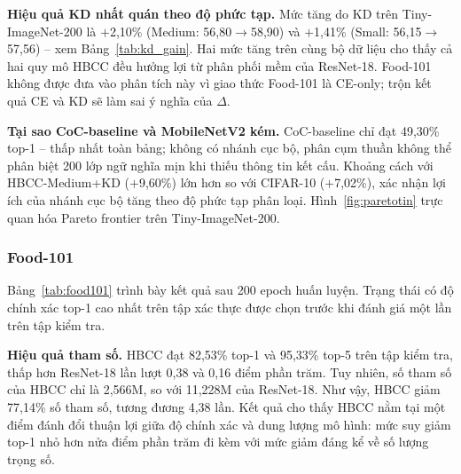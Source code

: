 \documentclass[conference]{IEEEtran}
\begin{document}
\noindent\textbf{Hiệu quả KD nhất quán theo độ phức tạp.}
Mức tăng do KD trên Tiny-ImageNet-200 là $+$2,10\% (Medium:
56,80$\to$58,90) và $+$1,41\% (Small: 56,15$\to$57,56) -- xem
Bảng~\ref{tab:kd_gain}. Hai mức tăng trên cùng bộ dữ liệu cho thấy
cả hai quy mô HBCC đều hưởng lợi từ phân phối mềm của ResNet-18.
Food-101 không được đưa vào phân tích này vì giao thức Food-101 là
CE-only; trộn kết quả CE và KD sẽ làm sai ý nghĩa của $\Delta$.

\noindent\textbf{Tại sao CoC-baseline và MobileNetV2 kém.}
CoC-baseline chỉ đạt 49,30\% top-1 -- thấp nhất toàn bảng; không có
nhánh cục bộ, phân cụm thuần không thể phân biệt 200 lớp ngữ nghĩa mịn
khi thiếu thông tin kết cấu. Khoảng cách với HBCC-Medium+KD
($+$9,60\%) lớn hơn so với CIFAR-10 ($+$7,02\%), xác nhận lợi ích
của nhánh cục bộ tăng theo độ phức tạp phân loại.
Hình~\ref{fig:paretotin} trực quan hóa Pareto frontier trên Tiny-ImageNet-200.

\subsubsection{Food-101}
\label{ssec:food_results}

Bảng~\ref{tab:food101} trình bày kết quả sau 200 epoch huấn luyện.
Trạng thái có độ chính xác top-1 cao nhất trên tập xác thực được chọn
trước khi đánh giá một lần trên tập kiểm tra.

\begin{table}[ht!]
  \caption{So sánh trên FOOD-101. \textbf{In đậm}: tốt nhất}
  \label{tab:food101}
  \centering
  \renewcommand{\arraystretch}{1.12}
\end{table}

\noindent\textbf{Hiệu quả tham số.}
HBCC đạt 82,53\% top-1 và 95,33\% top-5 trên tập kiểm tra, thấp hơn
ResNet-18 lần lượt 0,38 và 0,16 điểm phần trăm. Tuy nhiên, số tham số
của HBCC chỉ là 2,566M, so với 11,228M của ResNet-18. Như vậy, HBCC
giảm 77,14\% số tham số, tương đương 4,38 lần.
Kết quả cho thấy HBCC nằm tại một điểm đánh đổi thuận lợi giữa độ
chính xác và dung lượng mô hình: mức suy giảm top-1 nhỏ hơn nửa điểm
phần trăm đi kèm với mức giảm đáng kể về số lượng trọng số.
\end{document}
